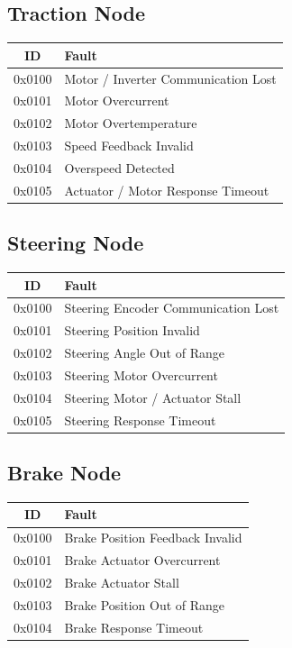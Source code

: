\documentclass[a4paper,11pt]{article}
\begin{document}
\subsection{Traction Node}

\begin{center}
\begin{tabular}{c l}
\toprule
\textbf{ID} & \textbf{Fault} \\
\midrule
0x0100 & Motor / Inverter Communication Lost \\
0x0101 & Motor Overcurrent \\
0x0102 & Motor Overtemperature \\
0x0103 & Speed Feedback Invalid \\
0x0104 & Overspeed Detected \\
0x0105 & Actuator / Motor Response Timeout \\
\bottomrule
\end{tabular}
\end{center}

\subsection{Steering Node}

\begin{center}
\begin{tabular}{c l}
\toprule
\textbf{ID} & \textbf{Fault} \\
\midrule
0x0100 & Steering Encoder Communication Lost \\
0x0101 & Steering Position Invalid \\
0x0102 & Steering Angle Out of Range \\
0x0103 & Steering Motor Overcurrent \\
0x0104 & Steering Motor / Actuator Stall \\
0x0105 & Steering Response Timeout \\
\bottomrule
\end{tabular}
\end{center}

\subsection{Brake Node}

\begin{center}
\begin{tabular}{c l}
\toprule
\textbf{ID} & \textbf{Fault} \\
\midrule
0x0100 & Brake Position Feedback Invalid \\
0x0101 & Brake Actuator Overcurrent \\
0x0102 & Brake Actuator Stall \\
0x0103 & Brake Position Out of Range \\
0x0104 & Brake Response Timeout \\
\bottomrule
\end{tabular}
\end{center}
\end{document}
